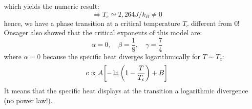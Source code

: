 \documentclass[../../Main/Main.tex]{subfiles}
\begin{document}
 which yields the numeric result:
 \begin{equation*} \Rightarrow T_c \simeq 2,264 J/k_B \neq 0
\end{equation*}
hence, we have a phase transition at a critical temperature \(T_c\) different from 0!
Onsager also showed that the critical exponents of this model are:
\begin{equation*}
\alpha =0,\quad \beta=\frac{1}{8}, \quad \gamma = \frac{7}{4}
\end{equation*}
where \(\alpha=0\)  because the specific heat diverges logarithmically for \(T \sim T_c\):
\begin{equation*}
  c \propto A \qty[-\ln{\qty(1- \frac{T}{T_c}) } + B  ]
\end{equation*}
It means that the specific heat displays at the transition a logarithmic divergence (no power law!).
\end{document}
